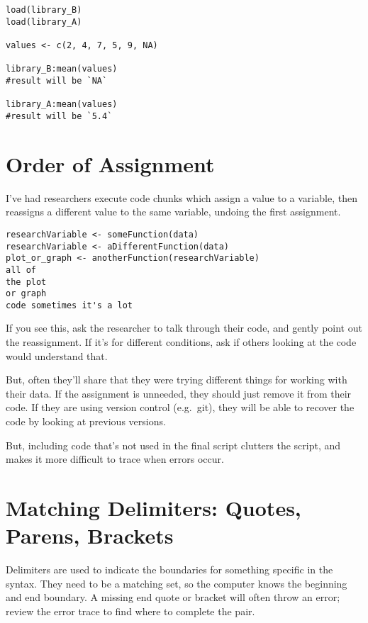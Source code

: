 \documentclass[
]{book}
\begin{document}
\begin{verbatim}
load(library_B)
load(library_A)

values <- c(2, 4, 7, 5, 9, NA)

library_B:mean(values) 
#result will be `NA`

library_A:mean(values) 
#result will be `5.4`
\end{verbatim}

\section{Order of Assignment}\label{order-of-assignment}

I've had researchers execute code chunks which assign a value to a variable,
then reassigns a different value to the same variable, undoing the first
assignment.

\begin{verbatim}
researchVariable <- someFunction(data)
researchVariable <- aDifferentFunction(data)
plot_or_graph <- anotherFunction(researchVariable)
all of
the plot
or graph
code sometimes it's a lot
\end{verbatim}

If you see this, ask the researcher to talk through their code, and gently point
out the reassignment. If it's for different conditions, ask if others looking at
the code would understand that.

But, often they'll share that they were trying different things for working
with their data. If the assignment is unneeded, they should just remove
it from their code. If they are using version control (e.g.~git), they will be
able to recover the code by looking at previous versions.

But, including code that's not used in the final script clutters the script, and
makes it more difficult to trace when errors occur.

\section{Matching Delimiters: Quotes, Parens, Brackets}\label{matching-delimiters-quotes-parens-brackets}

Delimiters are used to indicate the boundaries for something specific in the
syntax. They need to be a matching set, so the computer knows the beginning and
end boundary. A missing end quote or bracket will often throw an error; review
the error trace to find where to complete the pair.
\end{document}
